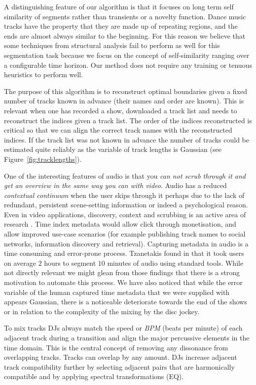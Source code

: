 \documentclass[twocolumn]{article}
\begin{document}
A distinguishing feature of our algorithm is that it focuses on long term self similarity of segments rather than transients or a novelty function. Dance music tracks have the property that they are made up of repeating regions, and the ends are almost always similar to the beginning. For this reason we believe that some techniques from structural analysis fail to perform as well for this segmentation task because we focus on the concept of self-similarity ranging over a configurable time horizon. Our method does not require any training or tenuous heuristics to perform well. 

The purpose of this algorithm is to reconstruct optimal boundaries given a fixed number of tracks known in advance (their names and order are known). This is relevant when one has recorded a show, downloaded a track list and needs to reconstruct the indices given a track list. The order of the indices reconstructed is critical so that we can align the correct track names with the reconstructed indices. If the track list was not known in advance the number of tracks could be estimated quite reliably as the variable of track lengths is Gaussian (see Figure~\ref{fig:tracklengths}).

One of the interesting features of audio is that you \textit{can not scrub through it and get an overview in the same way you can with video}. Audio has a reduced \textit{contextual continuum} when the user skips through it perhaps due to the lack of redundant, persistent scene-setting information or indeed a psychological reason. Even in video applications, discovery, context and scrubbing is an active area of research \cite{Matejka:2013:SIO:2470654.2466149}. Time index metadata would allow click through monetisation, and allow improved use-case scenarios (for example publishing track names to social networks, information discovery and retrieval). Capturing metadata in audio is a time consuming and error-prone process. Tzanetakis found in \cite{tzanetakis1999framework} that it took users on average $2$ hours to segment $10$ minutes of audio using standard tools. While not directly relevant we might glean from those findings that there is a strong motivation to automate this process. We have also noticed that while the error variable of the human captured time metadata that we were supplied with appears Gaussian, there is a noticeable deteriorate towards the end of the shows or in relation to the complexity of the mixing by the disc jockey. 

To mix tracks DJs always match the speed or \textit{BPM} (beats per minute) of each adjacent track during a transition and align the major percussive elements in the time domain. This is the central concept of removing any dissonance from overlapping tracks. Tracks can overlap by any amount. DJs increase adjacent track compatibility further by selecting adjacent pairs that are harmonically compatible and by applying spectral transformations (EQ).
 
\end{document}
